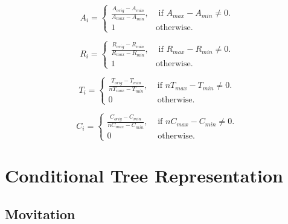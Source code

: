 \begin{equation}
A_i = \begin{cases}
     \frac{A_{orig} - A_{min}}{A_{max} - A_{min}}, & \text{ if }A_{max} - A_{min} \neq 0.\\
     1 & \mathrm{ otherwise}.
    \end{cases}
 \label{availNormalise}
\end{equation}

\begin{equation}
R_i = \begin{cases}
     \frac{R_{orig} - R_{min}}{R_{max} - R_{min}}, & \text{ if }R_{max} - R_{min} \neq 0.\\
     1 & \mathrm{ otherwise}.
    \end{cases}
 \label{reliaNormalise}
\end{equation}

\begin{equation}
T_i = \begin{cases}
     \frac{T_{orig} - T_{min}}{nT_{max} - T_{min}}, & \text{ if }nT_{max} - T_{min} \neq 0.\\
     0 & \text{ otherwise}.
    \end{cases}
 \label{timeNormalise}
\end{equation}

\begin{equation}
C_i = \begin{cases}
     \frac{C_{orig} - C_{min}}{nC_{max} - C_{min}}, & \text{ if }nC_{max} - C_{min} \neq 0.\\
     0 & \text{ otherwise}.
    \end{cases}
 \label{costNormalise}
\end{equation}

\section{Conditional Tree Representation}

\subsection{Movitation}
